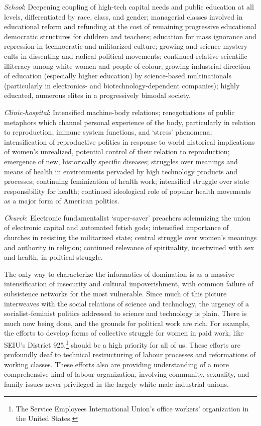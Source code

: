 \documentclass[DIV=12,%
               BCOR=10mm,%
               headinclude=false,%
               footinclude=false,open=any,%
               fontsize=11pt,%
               twoside,%
               paper=210mm:11in]%
               {scrbook}
\newcommand*{\hairline}{%
  \bigskip%
  \noindent \hrulefill%
  \bigskip%
}
\begin{document}
\emph{School}: Deepening coupling of high-tech capital needs and public education at all levels, differentiated by race, class, and gender; managerial classes involved in educational reform and refunding at the cost of remaining progressive educational democratic structures for children and teachers; education for mass ignorance and repression in technocratic and militarized culture; growing and-science mystery cults in dissenting and radical political movements; continued relative scientific illiteracy among white women and people of colour; growing industrial direction of education (especially higher education) by science-based multinationals (particularly in electronics- and biotechnology-dependent companies); highly educated, numerous elites in a progressively bimodal society.


\emph{Clinic-hospital}: Intensified machine-body relations; renegotiations of public metaphors which channel personal experience of the body, particularly in relation to reproduction, immune system functions, and ‘stress’ phenomena; intensification of reproductive politics in response to world historical implications of women’s unrealized, potential control of their relation to reproduction; emergence of new, historically specific diseases; struggles over meanings and means of health in environments pervaded by high technology products and processes; continuing feminization of health work; intensified struggle over state responsibility for health; continued ideological role of popular health movements as a major form of American politics.


\emph{Church}: Electronic fundamentalist ‘super-saver’ preachers solemnizing the union of electronic capital and automated fetish gods; intensified importance of churches in resisting the militarized state; central struggle over women’s meanings and authority in religion; continued relevance of spirituality, intertwined with sex and health, in political struggle.


\hairline


The only way to characterize the informatics of domination is as a massive intensification of insecurity and cultural impoverishment, with common failure of subsistence networks for the most vulnerable. Since much of this picture interweaves with the social relations of science and technology, the urgency of a socialist-feminist politics addressed to science and technology is plain. There is much now being done, and the grounds for political work are rich. For example, the efforts to develop forms of collective struggle for women in paid work, like SEIU’s District 925,\footnote{The Service Employees International Union’s office workers’ organization in the United States.} should be a high priority for all of us. These efforts are profoundly deaf to technical restructuring of labour processes and reformations of working classes. These efforts also are providing understanding of a more comprehensive kind of labour organization, involving community, sexuality, and family issues never privileged in the largely white male industrial unions.
\end{document}
